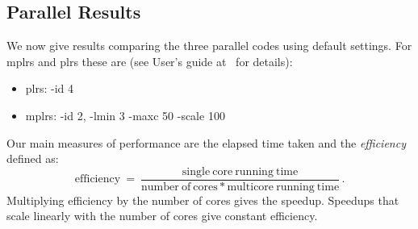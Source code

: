 \documentclass[a4paper,11pt]{article}   \usepackage{authblk} \usepackage[top=1.9cm,bottom=1.9cm,left=1.9cm,right=1.9cm]{geometry}
\newcommand{\progname}{\textsf}
\newcommand{\plrs}{\progname{plrs}\xspace}
\newcommand{\mplrs}{\progname{mplrs}\xspace}
\begin{document}
\subsection{Parallel Results}
\label{parallel}

We now give results comparing the three parallel codes using default settings.
For \mplrs and \plrs these are (see User's guide at~\cite{lrs} for details):
\begin{itemize}
\item \plrs: -id 4
\item \mplrs: -id 2, -lmin 3 -maxc 50 -scale 100
\end{itemize}
\noindent
Our main measures of performance are the elapsed time taken and
the {\em efficiency} defined as:
\begin{equation}
\mathrm{efficiency ~=~ \frac{single~core~running~time}{number~of~cores * multicore~running~time}}\,.
\label{eff}
\end{equation}
Multiplying efficiency by the number of cores gives the speedup.
Speedups that scale linearly with the number of cores give constant efficiency.
\end{document}
